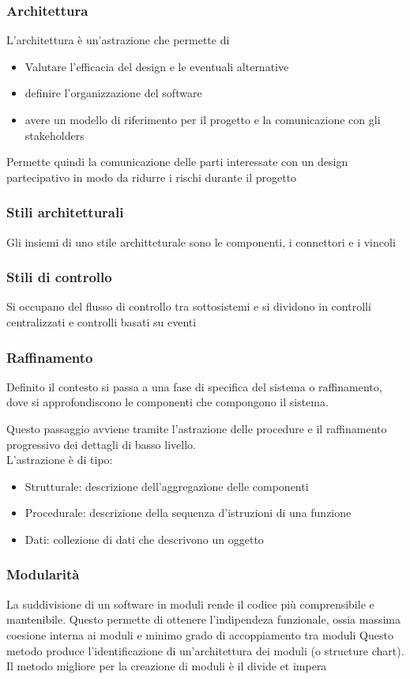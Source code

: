 \documentclass[12pt, a4paper]{article}
\begin{document}
\subsubsection{Architettura}
L'architettura è un'astrazione che permette di
\begin{itemize}
    \item Valutare l'efficacia del design e le eventuali alternative
    \item definire l'organizzazione del software
    \item avere un modello di riferimento per il progetto  e la comunicazione con gli stakeholders
\end{itemize}
Permette quindi la comunicazione delle parti interessate con un design partecipativo in modo da ridurre
i rischi durante il progetto

\subsubsection{Stili architetturali}
Gli insiemi di uno stile architteturale sono le componenti, i connettori e i vincoli

\subsubsection{Stili di controllo}
Si occupano del flusso di controllo tra sottosistemi e si dividono in controlli centralizzati e controlli 
basati su eventi

\subsubsection{Raffinamento}
Definito il contesto si passa a una fase di specifica del sistema o raffinamento, dove si approfondiscono
le componenti che compongono il sistema.

Questo passaggio avviene tramite l'astrazione delle procedure e il raffinamento progressivo dei dettagli di 
basso livello.\\L'astrazione è di tipo:
\begin{itemize}
    \item Strutturale: descrizione dell'aggregazione delle componenti
    \item Procedurale: descrizione della sequenza d'istruzioni di una funzione
    \item Dati: collezione di dati che descrivono un oggetto
\end{itemize}

\subsubsection{Modularità}
La suddivisione di un software in moduli rende il codice più comprensibile e mantenibile. Questo permette
di ottenere l'indipendeza funzionale, ossia massima coesione interna ai moduli e minimo grado di 
accoppiamento tra moduli Questo metodo produce l'identificazione di un'architettura dei moduli (o structure
chart).\\Il metodo migliore per la creazione di moduli è il divide et impera
\end{document}
